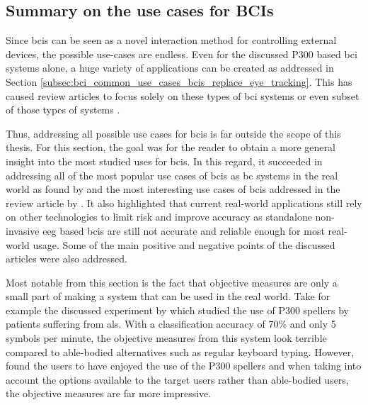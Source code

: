 
\subsection{Summary on the use cases for BCIs}
\label{subsec:bci_common_use_summary}


Since \glspl{bci} can be seen as a novel interaction method for controlling external devices, the possible use-cases are endless.
Even for the discussed P300 based \gls{bci} systems alone, a huge variety of applications can be created as addressed in Section \ref{subsec:bci_common_use_cases_bcis_replace_eye_tracking}.
This has caused review articles to focus solely on these types of \gls{bci} systems or even subset of those types of systems \citep{p300_review_article1, p300_review_article2, p300_review_article3}.

Thus, addressing all possible use cases for \glspl{bci} is far outside the scope of this thesis.
For this section, the goal was for the reader to obtain a more general insight into the most studied uses for \glspl{bci}.
In this regard, it succeeded in addressing all of the most popular use cases of \glspl{bci} as \gls{bc} systems in the real world as found by \citet{bci_review_arnau} and the most interesting use cases of \glspl{bci} addressed in the review article by \citet{bci_applications}.
It also highlighted that current real-world applications still rely on other technologies to limit risk and improve accuracy as standalone non-invasive \gls{eeg} based \glspl{bci} are still not accurate and reliable enough for most real-world usage.
Some of the main positive and negative points of the discussed articles were also addressed.

Most notable from this section is the fact that objective measures are only a small part of making a system that can be used in the real world.
Take for example the discussed experiment by \citet{p300_speller_real_life} which studied the use of P300 spellers by patients suffering from \gls{als}.
With a classification accuracy of 70\% and only 5 symbols per minute, the objective measures from this system look terrible compared to able-bodied alternatives such as regular keyboard typing.
However, \citet{p300_speller_real_life} found the users to have enjoyed the use of the P300 spellers and when taking into account the options available to the target users rather than able-bodied users, the objective measures are far more impressive.

